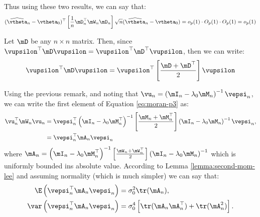 \documentclass[english,12pt]{book}\usepackage[]{graphicx}\usepackage[]{xcolor}
\begin{document}
\begin{subappendices}
Thus using these two results, we can say that:
\begin{equation*}
(\widehat{\vtheta}_n - \vtheta_0)^\top\left[\frac{1}{n}\mD_n^\top\mW_n\mD_n\right]\sqrt{n}(\widehat{\vtheta}_n - \vtheta_0)= o_p(1)\cdot O_p(1)\cdot O_p(1) = o_p(1)
\end{equation*}

\begin{remark}
Let $\mD$ be any $n\times n$ matrix. Then, since $\vupsilon^\top\mD\vupsilon = \vupsilon^\top\mD^\top\vupsilon$, then we can write:
\begin{equation*}
\vupsilon^\top\mD\vupsilon = \vupsilon^\top\left[\frac{\mD + \mD^\top}{2}\right]\vupsilon
\end{equation*}
\end{remark}

Using the previous remark, and noting that $\vu_n = \left(\mI_n-\lambda_0\mM_n\right)^{-1}\vepsi_n$, we can write the first element of Equation \eqref{eq:moran-p3} as:
\begin{equation*}
\begin{aligned}
\vu_n^\top\mW_n\vu_n &=\vepsi_n^\top\left(\mI_n-\lambda_0\mM_n^\top\right)^{-1}\left[\frac{\mM_n + \mM_n^\top}{2}\right]\left(\mI_n-\lambda_0\mM_n\right)^{-1}\vepsi_n,  \\
& = \vepsi_n^\top\mA_n\vepsi_n
\end{aligned}
\end{equation*}
%
where $\mA_n = \left(\mI_n-\lambda_0\mM_n^\top\right)^{-1}\left[\frac{\mW_n + \mW_n^\top}{2}\right]\left(\mI_n-\lambda_0\mM_n\right)^{-1}$ which is uniformly bounded ins absolute value. According to Lemma \ref{lemma:second-mom-lee} and assuming normality (which is much simpler) we can say that:
\begin{equation*}
  \begin{aligned}
    \E\left(\vepsi_n^\top\mA_n\vepsi_n\right) & = \sigma_0^2\tr(\mA_n), \\
    \var\left(\vepsi_n^\top\mA_n\vepsi_n\right) & = \sigma^4_0\left[\tr(\mA_n\mA_n^\top)+\tr(\mA^2_n)\right].
  \end{aligned}
\end{equation*}


\end{subappendices}
\end{document}
